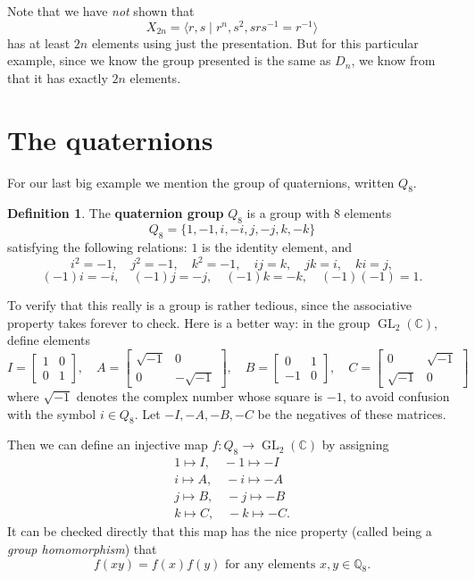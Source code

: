 \documentclass[12pt]{report}
\numberwithin{equation}{section}
\numberwithin{theorem}{chapter}
\theoremstyle{definition}
\newtheorem{definition}[theorem]{Definition}
\newtheorem*{basic properties}{Basic Properties}
\newtheorem*{Important Remark}{Important Remark}
\newcommand{\df}[1]{{\bf #1}\index{#1}}
\DeclareMathOperator{\GL}{GL}
\newcommand{\C}{\mathbb{C}}
\begin{document}
Note that we have {\em not} shown that
$$X_{2n}=\langle r,s \mid r^n, s^2, srs^{-1} = r^{-1} \rangle$$
has at least $2n$ elements using just the presentation. But for this particular example, since we know the group presented is the same as $D_n$, we know from  that it has exactly $2n$ elements.






\section{The quaternions}\label{quaternions}


For our last big example we mention the group of quaternions, written $Q_8$. 

\begin{definition}
The \df{quaternion group} $Q_8$ is a group with $8$ elements 
$$Q_8=\{ 1, -1, i, -i, j, -j, k, -k \}  $$
satisfying  the following relations:  $1$ is the identity element, and 
$$i^2 = -1, \quad j^2 = -1, \quad k^2 =-1, \quad ij = k, \quad jk = i, \quad ki = j, $$
$$(-1)i = -i, \quad (-1)j = -j, \quad (-1)k = -k, \quad (-1)(-1) = 1.$$
\end{definition}

To verify that this really is a group is rather tedious, since the associative property takes forever to check. Here is a better way: in the group $\GL_2(\C)$, define elements
$$
I = 
\begin{bmatrix}
1 & 0 \\ 0 & 1
\end{bmatrix},
\quad
A =  
\begin{bmatrix}
\sqrt{-1} & 0 \\ 0 & -\sqrt{-1} 
\end{bmatrix},
\quad 
B =  \begin{bmatrix}
0 & 1 \\ -1 & 0 
\end{bmatrix},
\quad
C =  \begin{bmatrix}
0 & \sqrt{-1} \\ \sqrt{-1} & 0 
\end{bmatrix}
$$
where $\sqrt{-1}$ denotes the complex number whose square is $-1$, to avoid confusion with the symbol $i \in Q_8$.
Let $-I, -A, -B, -C$ be the negatives of these matrices. 

Then we can define an injective map $f:Q_8\to \GL_2(\C)$ by assigning 
\begin{eqnarray*}
1\mapsto  I,  \quad  -1\mapsto  -I\\
 i\mapsto  A, \quad -i\mapsto -A \\
 j\mapsto B, \quad  -j\mapsto -B \\
 k\mapsto C, \quad  -k\mapsto -C.
\end{eqnarray*}
It can be checked directly that this map has the nice property (called being a {\em group homomorphism}) that 
$$f(xy)=f(x)f(y) \text{ for any elements } x,y\in \mathbb{Q}_8.$$
\end{document}
